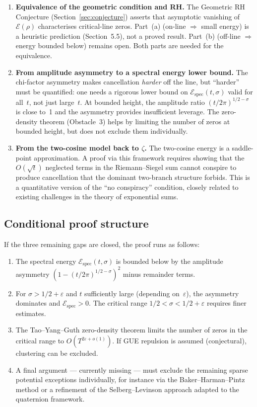 \documentclass[12pt,a4paper]{article}
\begin{document}
\begin{enumerate}[label=\textbf{\arabic*.}]
\item \textbf{Equivalence of the geometric condition and RH.} The Geometric RH Conjecture (Section~\ref{sec:conjecture}) asserts that asymptotic vanishing of $\mathcal{E}(\rho)$ characterises critical-line zeros. Part~(a) (on-line $\Rightarrow$ small energy) is a heuristic prediction (Section~5.5), not a proved result. Part~(b) (off-line $\Rightarrow$ energy bounded below) remains open. Both parts are needed for the equivalence.
\item \textbf{From amplitude asymmetry to a spectral energy lower bound.} The chi-factor asymmetry makes cancellation \emph{harder} off the line, but ``harder'' must be quantified: one needs a rigorous lower bound on $\mathcal{E}_{\mathrm{spec}}(t,\sigma)$ valid for all~$t$, not just large~$t$. At bounded height, the amplitude ratio $(t/2\pi)^{1/2-\sigma}$ is close to~1 and the asymmetry provides insufficient leverage. The zero-density theorem (Obstacle~3) helps by limiting the number of zeros at bounded height, but does not exclude them individually.
\item \textbf{From the two-cosine model back to $\zeta$.} The two-cosine energy is a saddle-point approximation. A proof via this framework requires showing that the $O(\sqrt{t})$ neglected terms in the Riemann--Siegel sum cannot conspire to produce cancellation that the dominant two-branch structure forbids. This is a quantitative version of the ``no conspiracy'' condition, closely related to existing challenges in the theory of exponential sums.
\end{enumerate}

\subsection{Conditional proof structure}

If the three remaining gaps are closed, the proof runs as follows:

\begin{enumerate}[label=\textbf{Step \arabic*.}]
\item The spectral energy $\mathcal{E}_{\mathrm{spec}}(t,\sigma)$ is bounded below by the amplitude asymmetry $(1-(t/2\pi)^{1/2-\sigma})^2$ minus remainder terms.
\item For $\sigma > 1/2+\varepsilon$ and $t$ sufficiently large (depending on~$\varepsilon$), the asymmetry dominates and $\mathcal{E}_{\mathrm{spec}} > 0$. The critical range $1/2 < \sigma < 1/2+\varepsilon$ requires finer estimates.
\item The Tao--Yang--Guth zero-density theorem limits the number of zeros in the critical range to $O(T^{2\varepsilon+o(1)})$. If GUE repulsion is assumed (conjectural), clustering can be excluded.
\item A final argument --- currently missing --- must exclude the remaining sparse potential exceptions individually, for instance via the Baker--Harman--Pintz method or a refinement of the Selberg--Levinson approach adapted to the quaternion framework.
\end{enumerate}
\end{document}

